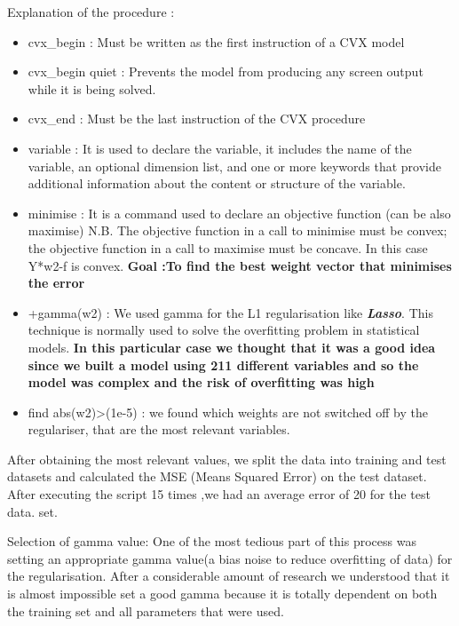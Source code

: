 Explanation of the procedure : 

\begin{itemize}
\item cvx\_begin : Must be written as the first instruction of a CVX model
\item cvx\_begin quiet : Prevents the model from producing any screen output while it is being solved.
\item cvx\_end : Must be the last instruction of the CVX procedure 
\item variable : It is used to declare the variable, it includes the name of the variable, an optional dimension list, and one or more keywords that provide additional information about the content or structure of the variable.
\item minimise : It is a command used to declare an objective function (can be also maximise) 
N.B. The objective function in a call to minimise must be convex; the objective function in a call to maximise must be concave. In this case Y*w2-f is convex.
\newline
\textbf{Goal :To find the best weight vector that minimises the error }
\item +gamma(w2) : We used gamma for the L1 regularisation like \textit{\textbf{Lasso}}. This technique is normally used to solve the overfitting problem in statistical models. \textbf{In this particular case we thought that it was a good idea since we built a model using 211 different variables and so the model was complex and the risk of overfitting was high}
\item find abs(w2)\textgreater(1e-5) : we found which weights are not switched off by the regulariser, that are the most relevant variables. 
\end{itemize}

After obtaining the most relevant values, we split the data into training and test datasets and calculated the MSE (Means Squared Error) on the test dataset. After executing the script 15 times ,we had an average error of 20 for the test data. set\cite{rossi2013exchange}. 

Selection of gamma value:
\newline
One of the most tedious part of this process was setting an appropriate gamma value(a bias noise to reduce overfitting of data) for the regularisation. After a considerable amount of research we understood that it is almost impossible set a good gamma because it is totally dependent on both the training set and all parameters that were used\cite{philip2011artificial}. 

